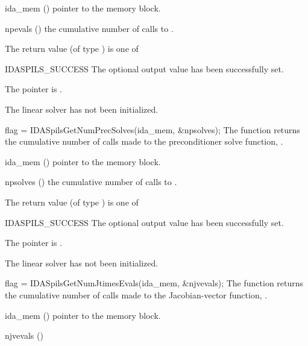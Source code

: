 {{}
{
  \begin{args}[npevals]
  \item[ida\_mem] ()
    pointer to the {\ida} memory block.
  \item[npevals] ()
    the cumulative number of calls to .
  \end{args}
}
{
  The return value  (of type ) is one of
  \begin{args}
  \item[IDASPILS\_SUCCESS] 
    The optional output value has been successfully set.
  \item[\Id{IDASPILS\_MEM\_NULL}]
    The  pointer is .
  \item[\Id{IDASPILS\_LMEM\_NULL}]
    The {\idaspils} linear solver has not been initialized.
  \end{args}
}
{}
{
  flag = IDASpilsGetNumPrecSolves(ida\_mem, \&npsolves);
}
{
  The function  returns the
  cumulative number of calls made to the preconditioner 
  solve function, .
}
{
  \begin{args}[npsolves]
  \item[ida\_mem] ()
    pointer to the {\ida} memory block.
  \item[npsolves] ()
    the cumulative number of calls to .
  \end{args}
}
{
  The return value  (of type ) is one of
  \begin{args}
  \item[IDASPILS\_SUCCESS] 
    The optional output value has been successfully set.
  \item[\Id{IDASPILS\_MEM\_NULL}]
    The  pointer is .
  \item[\Id{IDASPILS\_LMEM\_NULL}]
    The {\idaspils} linear solver has not been initialized.
  \end{args}
}
{}
{
  flag = IDASpilsGetNumJtimesEvals(ida\_mem, \&njvevals);
}
{
  The function  returns the
  cumulative number of calls made to the Jacobian-vector function,
  .
}
{
  \begin{args}[njvevals]
  \item[ida\_mem] ()
    pointer to the {\ida} memory block.
  \item[njvevals] ()

\end{args}}}
